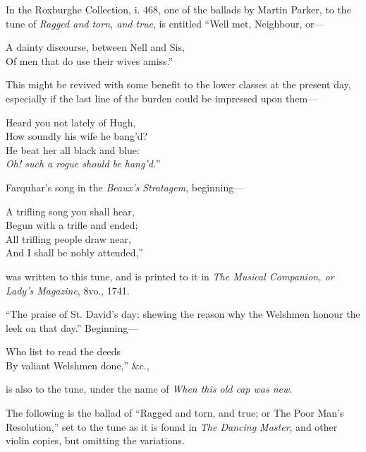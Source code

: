 In the Roxburghe Collection, i. 468, one of the ballads by Martin Parker, to
the tune of \textit{Ragged and torn, and true}, is entitled “Well met, Neighbour, or—
\settowidth{\versewidth}{A dainty discourse, between Nell and Sis,}
\begin{scverse}
A dainty discourse, between Nell and Sis,\\
Of men that do use their wives amiss.”
\end{scverse}
This might be revived with some benefit to the lower classes at the present day,
especially if the last line of the burden could be impressed upon them—
\begin{scverse}
\begin{altverse}
Heard you not lately of Hugh,\\
How soundly his wife he bang’d?\\
He beat her all black and blue:\\
\textit{Oh! such a rogue should be hang’d.}”
\end{altverse}
\end{scverse}
\pagebreak
Farquhar’s song in the \textit{Beaux's Stratagem}, beginning—
\settowidth{\versewidth}{A trifling song you shall hear,}
\begin{scverse}
\begin{altverse}
A trifling song you shall hear,\\
Begun with a trifle and ended;\\
All trifling people draw near,\\
And I shall be nobly attended,”
\end{altverse}
\end{scverse}
was written to this tune, and is printed to it in \textit{The Musical Companion, or Lady's
Magazine}, 8vo., 1741.

“The praise of St. David’s day: shewing the reason why the Welshmen honour
the leek on that day.” Beginning—
\settowidth{\versewidth}{Who list to read the deeds}
\begin{scverse}
Who list to read the deeds\\
By valiant Welshmen done,” \&c.,
\end{scverse}
is also to the tune, under the name of \textit{When this old cap was new}.

The following is the ballad of “Ragged and torn, and true; or The Poor Man’s
Resolution,” set to the tune as it is found in \textit{The Dancing Master}, and other
violin copies, but omitting the variations.


